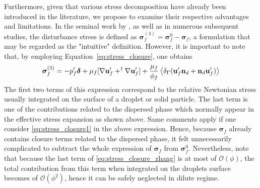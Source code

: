 Furthermore, given that various stress decomposition have already been introduced in the literature, we propose to examine their respective advantages and limitations. 
In the seminal work by \citet{zhang1997momentum}, as well as in numerous subsequent studies, the disturbance stress is defined as $\bm\sigma_f^{(3)} = \bm\sigma_f^0 - \bm\sigma_f$, a formulation that may be regarded as the "intuitive" definition. 
However, it is important to note that, by employing Equation~\ref{eq:stress_closure}, one obtains
\begin{equation}
    \bm\sigma_f^{(3)}
    =
    -p_f'\bm\delta
    + \mu_f [
        \grad \textbf{u}_f'
        + ^\dagger \grad \textbf{u}_f'
    ]
    + \frac{\mu_f}{\phi_f} \avg{\delta_\Gamma( \textbf{u}_f'  \textbf{n}_d +  \textbf{n}_d \textbf{u}_f' )}
    \label{eq:stress_closure_zhang}
\end{equation}
The first two terms of this expression correspond to the relative Newtonian stress usually integrated on the surface of a droplet or solid particle.
The last term is one of the contributions related to the dispersed phase which normally appear in the effective stress expansion as shown above. 
Same comments apply if one consider \ref{eq:stress_closure1} in the above expression. 
Hence, because $\bm\sigma_f$ already contains closure terms related to the dispersed phase, it felt unnecessarily complicated to subtract the whole expression of $\bm\sigma_f$ from $\bm\sigma_f^0$.
Nevertheless, note that because the last term of \ref{eq:stress_closure_zhang} is at most of $\mathcal{O}(\phi)$, the total contribution from this term when integrated on the droplets surface becomes of $\mathcal{O}(\phi^2)$, hence it can be safely neglected in dilute regime. 

